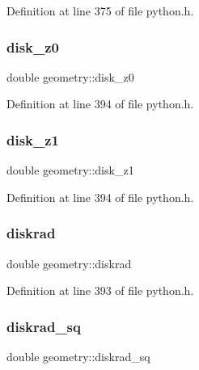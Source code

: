 Definition at line 375 of file python.\+h.

\mbox{\label{structgeometry_abbd420cc3feb4b5e2e50acd27178359a}} 
\subsubsection{\texorpdfstring{disk\+\_\+z0}{disk\_z0}}
{\footnotesize\ttfamily double geometry\+::disk\+\_\+z0}



Definition at line 394 of file python.\+h.

\mbox{\label{structgeometry_a4339ab178af4a987c9f4199d4a543b03}} 
\subsubsection{\texorpdfstring{disk\+\_\+z1}{disk\_z1}}
{\footnotesize\ttfamily double geometry\+::disk\+\_\+z1}



Definition at line 394 of file python.\+h.

\mbox{\label{structgeometry_a71b7a3a06fb5c18efba2b2642cb8e060}} 
\subsubsection{\texorpdfstring{diskrad}{diskrad}}
{\footnotesize\ttfamily double geometry\+::diskrad}



Definition at line 393 of file python.\+h.

\mbox{\label{structgeometry_a88a16d3b999dd6b48db5d132df36b704}} 
\subsubsection{\texorpdfstring{diskrad\+\_\+sq}{diskrad\_sq}}
{\footnotesize\ttfamily double geometry\+::diskrad\+\_\+sq}



